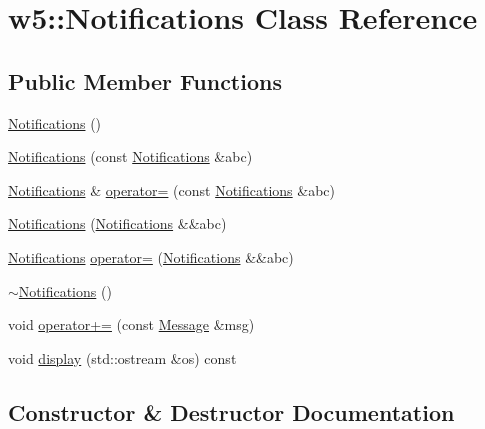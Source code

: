\hypertarget{classw5_1_1_notifications}{}\section{w5\+:\+:Notifications Class Reference}
\label{classw5_1_1_notifications}
\subsection*{Public Member Functions}
\begin{DoxyCompactItemize}
\item 
\mbox{\hyperlink{classw5_1_1_notifications_af5482f22a6d4ad6c55256123776c8870}{Notifications}} ()
\item 
\mbox{\hyperlink{classw5_1_1_notifications_a61b8d9e26f969e42537a22194dae4078}{Notifications}} (const \mbox{\hyperlink{classw5_1_1_notifications}{Notifications}} \&abc)
\item 
\mbox{\hyperlink{classw5_1_1_notifications}{Notifications}} \& \mbox{\hyperlink{classw5_1_1_notifications_ac46f701bd1bc9acad70d75217554baca}{operator=}} (const \mbox{\hyperlink{classw5_1_1_notifications}{Notifications}} \&abc)
\item 
\mbox{\hyperlink{classw5_1_1_notifications_a123a389920ea6c6d60840577b9663c25}{Notifications}} (\mbox{\hyperlink{classw5_1_1_notifications}{Notifications}} \&\&abc)
\item 
\mbox{\hyperlink{classw5_1_1_notifications}{Notifications}} \mbox{\hyperlink{classw5_1_1_notifications_ae1c5a19fc8b0eaff1602d28dce92c454}{operator=}} (\mbox{\hyperlink{classw5_1_1_notifications}{Notifications}} \&\&abc)
\item 
\mbox{\hyperlink{classw5_1_1_notifications_a657e031fdb6442a8aacb968ce351c569}{$\sim$\+Notifications}} ()
\item 
void \mbox{\hyperlink{classw5_1_1_notifications_ab6331b2dc2d9af68e462fdaecb74b43d}{operator+=}} (const \mbox{\hyperlink{classw5_1_1_message}{Message}} \&msg)
\item 
void \mbox{\hyperlink{classw5_1_1_notifications_a0272d577ac9277d500118d635b460670}{display}} (std\+::ostream \&os) const
\end{DoxyCompactItemize}


\subsection{Constructor \& Destructor Documentation}
\mbox{\label{classw5_1_1_notifications_af5482f22a6d4ad6c55256123776c8870}} 
